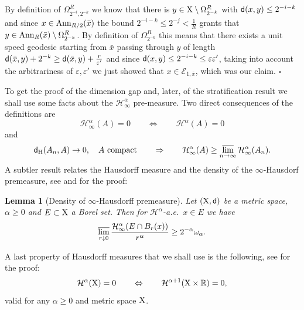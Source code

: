 \documentclass[reqno,11pt]{article}
\numberwithin{equation}{section}
\newcommand{\R}{\mathbb{R}}
\newcommand{\sfd}{{\sf d}}
\newcommand{\eps}{\varepsilon}
\newcommand{\lims}{\varlimsup}
\renewenvironment{proof}{\removelastskip\par\medskip   %
\noindent{\em Proof} \rm}{\penalty-20\null\hfill$\square$\par\medbreak}
\newtheorem{lemma}[theorem]{Lemma}
\newcommand{\X}{{\rm X}}
\newcommand{\HH}{{\mathcal H}}
\begin{document}
\begin{proof}
By definition of $\Omega^R_{2^{-i},2^{-k}}$ we know that there is $y\in \X\setminus \Omega^R_{2^{-k}}$ with $\sfd(x,y)\leq 2^{-i-k}$ and since $x\in{\rm Ann}_{R/2}(\bar x)$ the bound  $2^{-i-k}\leq 2^{-j}< \frac1{R}$ grants that $y\in {\rm Ann}_R(\bar x)\setminus \Omega^R_{2^{-k}}$. By definition of $\Omega^R_{2^{-k}}$ this means  that there exists  a unit speed geodesic starting from $\bar x$ passing through $y$ of length $\sfd(\bar x,y)+2^{-k}\geq \sfd(\bar x,y)+\frac{r}{\eps'}$ and since $\sfd(x,y)\leq 2^{-i-k}\leq \eps\eps'$, taking into account the arbitrariness of $\eps,\eps'$ we just showed  that $x\in \mathcal E_{1,\bar x}$, which was our claim.
\end{proof}
To get the proof of the dimension gap and, later, of the stratification result we shall use some facts about the $\HH^\alpha_\infty$ pre-measure. Two direct consequences of the definitions are
\begin{equation}
\label{eq:samenull}
\HH^\alpha_\infty(A)=0\qquad\Leftrightarrow\qquad\HH^\alpha(A)=0
\end{equation}
and
\begin{equation}
\label{eq:usc}
\sfd_{\rm H}(A_n,A)\to 0,\quad A\text{ compact}\qquad\Rightarrow \qquad\HH^\alpha_\infty(A)\geq \lims_{n\to\infty}\HH^\alpha_\infty(A_n).
\end{equation}
A  subtler result relates the Hausdorff measure and the density of the $\infty$-Hausdorf premeasure, see \cite[Proposition 11.3]{Giusti84} and \cite[Theorem 2.10.17]{Federer69} for the proof:
\begin{lemma}[Density of $\infty$-Hausdorff premeasure]\label{le:hinfty}
Let $(\X,\sfd)$ be a   metric space, $\alpha\geq 0$ and $E\subset \X$ a Borel set. Then for $\HH^\alpha$-a.e.\ $x\in E$ we have
\[
\lims_{r\downarrow 0}\frac{\HH_\infty^\alpha(E\cap B_r(x)) }{r^\alpha}\geq 2^{-\alpha}\omega_\alpha.
\]
\end{lemma}
A last property of Hausdorff measures that we shall use is the following, see  \cite[Theorem 2.10.45]{Federer69} for the proof:
\begin{equation}
\label{eq:dimprod}
\HH^{\alpha}(\X)=0\qquad\Leftrightarrow\qquad \HH^{\alpha+1}(\X\times\R)=0,
\end{equation}
valid for any $\alpha\geq 0$ and metric space $\X$.
\end{document}
